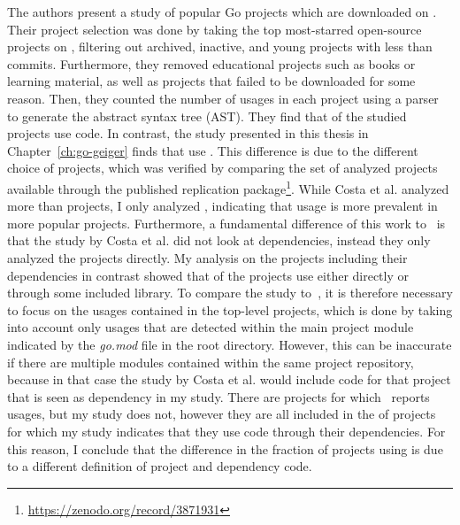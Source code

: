 The authors present a study of  popular Go projects which are downloaded on .
Their project selection was done by taking the top  most-starred open-source projects on \github{},
filtering out archived, inactive, and young projects with less than  commits.
Furthermore, they removed educational projects such as books or learning material, as well as projects that failed to
be downloaded for some reason.
Then, they counted the number of \unsafe{} usages in each project using a parser to generate the abstract syntax tree
(\acrshort{AST}).
They find that  of the studied projects use \unsafe{} code.
In contrast, the study presented in this thesis in Chapter~\ref{ch:go-geiger} finds that \percentageUnsafeProjects{}
use \unsafe{}.
This difference is due to the different choice of projects, which was verified by comparing the set of analyzed projects
available through the published replication package\footnote{\url{https://zenodo.org/record/3871931}}.
While Costa et al. analyzed more than  projects, I only analyzed \projsAnalyzed{}, indicating that
\unsafe{} usage is more prevalent in more popular projects.
Furthermore, a fundamental difference of this work to~\cite{costa2020} is that the study by Costa et al. did not look
at dependencies, instead they only analyzed the projects directly.
My analysis on the projects including their dependencies in contrast showed that
\percentageUnsafeTransitiveWithDependencies{} of the projects use \unsafe{} either directly or through some included
library.
To compare the study to~\cite{costa2020}, it is therefore necessary to focus on the \unsafe{} usages contained in the
top-level projects, which is done by taking into account only usages that are detected within the main project module
indicated by the \textit{go.mod} file in the root directory.
However, this can be inaccurate if there are multiple modules contained within the same project repository, because in
that case the study by Costa et al. would include code for that project that is seen as dependency in my study.
There are  projects for which~\cite{costa2020} reports \unsafe{} usages, but my study does not, however
they are all included in the \percentageUnsafeTransitiveWithDependencies{} of projects for which my study indicates that
they use \unsafe{} code through their dependencies.
For this reason, I conclude that the difference in the fraction of projects using \unsafe{} is due to a different
definition of project and dependency code.

